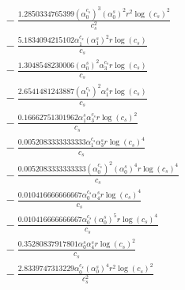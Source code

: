 \documentclass[10pt]{article}
\begin{document}
\begin{align*}
&{}  - \frac{1.2850334765399 \left(\alpha_{0}^{c_s}\right)^{3} \left(\alpha_{0}^s\right)^{2} r^{2} \log{\left(c_{s} \right)}^{2}}{c_{s}^{2}} \\
&{}  - \frac{5.1834094215102 \alpha_{1}^{c_s} \left(\alpha_{1}^s\right)^{2} r \log{\left(c_{s} \right)}}{c_{s}} \\
&{}  - \frac{1.3048548230006 \left(\alpha_{0}^s\right)^{2} \alpha_{3}^{c_s} r \log{\left(c_{s} \right)}}{c_{s}} \\
&{}  - \frac{2.6541481243887 \left(\alpha_{1}^{c_s}\right)^{2} \alpha_{1}^s r \log{\left(c_{s} \right)}}{c_{s}} \\
&{}  - \frac{0.16662751301962 \alpha_{1}^s \alpha_{3}^{c_s} r \log{\left(c_{s} \right)}^{2}}{c_{s}} \\
&{}  - \frac{0.0052083333333333 \alpha_{1}^{c_s} \alpha_{3}^s r \log{\left(c_{s} \right)}^{4}}{c_{s}} \\
&{}  - \frac{0.0052083333333333 \left(\alpha_{0}^{c_s}\right)^{2} \left(\alpha_{0}^s\right)^{4} r \log{\left(c_{s} \right)}^{4}}{c_{s}} \\
&{}  - \frac{0.010416666666667 \alpha_{0}^{c_s} \alpha_{4}^s r \log{\left(c_{s} \right)}^{4}}{c_{s}} \\
&{}  - \frac{0.010416666666667 \alpha_{0}^{c_s} \left(\alpha_{0}^s\right)^{5} r \log{\left(c_{s} \right)}^{4}}{c_{s}} \\
&{}  - \frac{0.35280837917801 \alpha_{0}^s \alpha_{4}^s r \log{\left(c_{s} \right)}^{2}}{c_{s}} \\
&{}  - \frac{2.8339747313229 \alpha_{0}^{c_s} \left(\alpha_{0}^s\right)^{4} r^{2} \log{\left(c_{s} \right)}^{2}}{c_{s}^{2}}
\end{align*}
\end{document}

